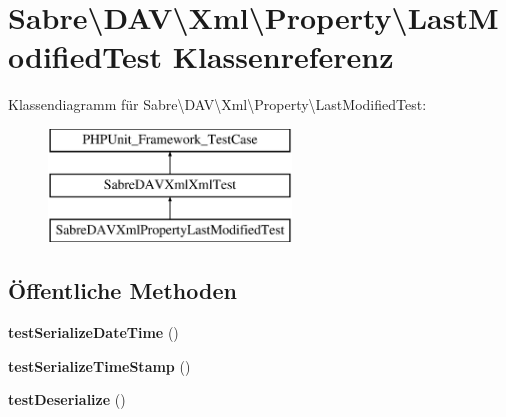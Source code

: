 \hypertarget{class_sabre_1_1_d_a_v_1_1_xml_1_1_property_1_1_last_modified_test}{}\section{Sabre\textbackslash{}D\+AV\textbackslash{}Xml\textbackslash{}Property\textbackslash{}Last\+Modified\+Test Klassenreferenz}
\label{class_sabre_1_1_d_a_v_1_1_xml_1_1_property_1_1_last_modified_test}
Klassendiagramm für Sabre\textbackslash{}D\+AV\textbackslash{}Xml\textbackslash{}Property\textbackslash{}Last\+Modified\+Test\+:\begin{figure}[H]
\begin{center}
\leavevmode
\includegraphics[height=3.000000cm]{class_sabre_1_1_d_a_v_1_1_xml_1_1_property_1_1_last_modified_test}
\end{center}
\end{figure}
\subsection*{Öffentliche Methoden}
\begin{DoxyCompactItemize}
\item 
\mbox{\label{class_sabre_1_1_d_a_v_1_1_xml_1_1_property_1_1_last_modified_test_aac8ec37f40719a4dff138fb6923c4789}} 
{\bfseries test\+Serialize\+Date\+Time} ()
\item 
\mbox{\label{class_sabre_1_1_d_a_v_1_1_xml_1_1_property_1_1_last_modified_test_acc3f0fdbbf701bebe990e2f9f6b4b814}} 
{\bfseries test\+Serialize\+Time\+Stamp} ()
\item 
\mbox{\label{class_sabre_1_1_d_a_v_1_1_xml_1_1_property_1_1_last_modified_test_a38a4f13a83a10f5fe90ab24182fc422b}} 
{\bfseries test\+Deserialize} ()
\end{DoxyCompactItemize}
